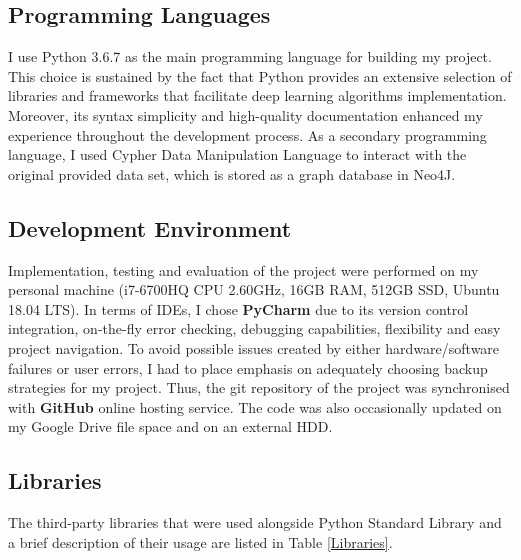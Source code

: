\subsection{Programming Languages}

I use Python 3.6.7 as the main programming language for building my project. This choice is sustained by the fact that Python provides an extensive selection of libraries and frameworks that facilitate deep learning algorithms implementation. Moreover, its syntax simplicity and high-quality documentation enhanced my experience throughout the development process. As a secondary programming language, I used Cypher Data Manipulation Language to interact with the original provided data set, which is stored as a graph database in Neo4J.

\subsection{Development Environment}

Implementation, testing and evaluation of the project were performed on my personal machine (i7-6700HQ CPU 2.60GHz, 16GB RAM, 512GB SSD,  Ubuntu 18.04 LTS). In terms of IDEs, I chose \textbf{PyCharm} due to its version control integration, on-the-fly error checking, debugging capabilities, flexibility and easy project navigation. To avoid possible issues created by either hardware/software failures or user errors, I had to place emphasis on adequately choosing backup strategies for my project. Thus, the git repository of the project was synchronised with \textbf{GitHub} online hosting service. The code was also occasionally updated on my Google Drive file space and on an external HDD. 

\subsection{Libraries}

The third-party libraries that were used alongside Python Standard Library and a brief description of their usage are listed in Table \ref{Libraries}. \bigskip

